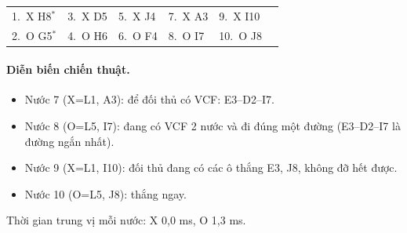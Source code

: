 {\footnotesize\linespread{1}\selectfont
\noindent\begin{tabularx}{\linewidth}{*{6}{X}}
\toprule
1.~X H8$^\ast$ & 3.~X D5 & 5.~X J4 & 7.~X A3 & 9.~X I10 &  \\
2.~O G5$^\ast$ & 4.~O H6 & 6.~O F4 & 8.~O I7 & 10.~O J8 &  \\
\bottomrule
\end{tabularx}\par}
\paragraph{Diễn biến chiến thuật.}
\begin{itemize}\small
\setlength{\itemsep}{0pt}
  \item Nước 7 (X=L1, A3): để đối thủ có VCF: E3--D2--I7.
  \item Nước 8 (O=L5, I7): đang có VCF 2 nước và đi đúng một đường (E3--D2--I7 là đường ngắn nhất).
  \item Nước 9 (X=L1, I10): đối thủ đang có các ô thắng E3, J8, không đỡ hết được.
  \item Nước 10 (O=L5, J8): thắng ngay.
\end{itemize}
Thời gian trung vị mỗi nước: X 0,0 ms, O 1,3 ms.
\clearpage

